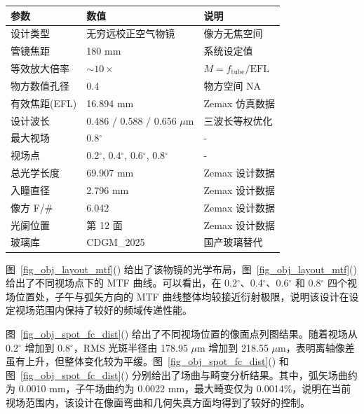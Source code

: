 \begin{table}[htbp]
    \centering
    \label{tab:obj_spec}
    \begin{tabular}{lll}
        \toprule
        参数 & 数值 & 说明 \\
        \midrule
        设计类型 & 无穷远校正空气物镜 & 像方无焦空间 \\
        管镜焦距 & 180 mm & 系统设定值 \\
        等效放大倍率 & $\sim 10\times$ &  $M=f_{\mathrm{tube}}/\mathrm{EFL}$  \\
        物方数值孔径 & 0.4 & 物方空间 NA \\
        有效焦距(EFL) & 16.894 mm & Zemax 仿真数据 \\
        设计波长 & 0.486 / 0.588 / 0.656 $\mu$m & 三波长等权优化 \\
        最大视场 & 0.8$^\circ$ & - \\
        视场点 & 0.2$^\circ$, 0.4$^\circ$, 0.6$^\circ$, 0.8$^\circ$ & - \\
        总光学长度 & 69.907 mm & Zemax 设计数据 \\
        入瞳直径 & 2.796 mm & Zemax 设计数据 \\
        像方 F/\# & 6.042 & Zemax 设计数据 \\
        光阑位置 & 第 12 面 & Zemax 设计数据 \\
        玻璃库 & CDGM\_2025 & 国产玻璃替代 \\
        \bottomrule
    \end{tabular}
\end{table}

图~\ref{fig_obj_layout_mtf}() 给出了该物镜的光学布局，图~\ref{fig_obj_layout_mtf}() 给出了不同视场点下的 MTF 曲线。可以看出，在 0.2$^\circ$、0.4$^\circ$、0.6$^\circ$ 和 0.8$^\circ$ 四个视场位置处，子午与弧矢方向的 MTF 曲线整体均较接近衍射极限，说明该设计在设定视场范围内保持了较好的频域传递性能。

图~\ref{fig_obj_spot_fc_dist}() 给出了不同视场位置的像面点列图结果。随着视场从 0.2$^\circ$ 增加到 0.8$^\circ$，RMS 光斑半径由 178.95 $\mu$m 增加到 218.55 $\mu$m，表明离轴像差虽有上升，但整体变化较为平缓。图~\ref{fig_obj_spot_fc_dist}() 和图~\ref{fig_obj_spot_fc_dist}() 分别给出了场曲与畸变分析结果。其中，弧矢场曲约为 0.0010 mm，子午场曲约为 0.0022 mm，最大畸变仅为 0.0014\%，说明在当前视场范围内，该设计在像面弯曲和几何失真方面均得到了较好的控制。

